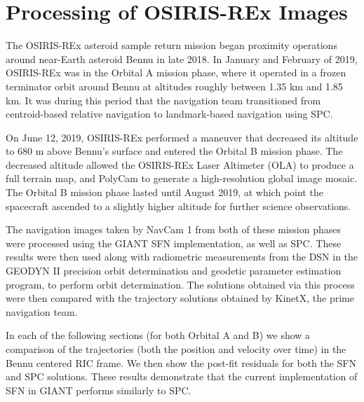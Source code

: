 \documentclass{RPI-SIW}
\begin{document}
\section*{Processing of OSIRIS-REx Images}
The OSIRIS-REx asteroid sample return mission began proximity operations around near-Earth asteroid Bennu in late 2018.  In January and February of 2019, OSIRIS-REx was in the Orbital A mission phase, where it operated in a frozen terminator orbit around Bennu at altitudes roughly between 1.35 km and 1.85 km.  It was during this period that the navigation team transitioned from centroid-based relative navigation to landmark-based navigation using SPC.

On June 12, 2019, OSIRIS-REx performed a maneuver that decreased its altitude to 680 m above Bennu's surface and entered the Orbital B mission phase.  The decreased altitude allowed the OSIRIS-REx Laser Altimeter (OLA)\cite{ola} to produce a full terrain map, and PolyCam\cite{ocams} to generate a high-resolution global image mosaic.  The Orbital B mission phase lasted until August 2019, at which point the spacecraft ascended to a slightly higher altitude for further science observations.

The navigation images taken by NavCam 1\cite{tagcams} from both of these mission phases were processed using the GIANT SFN implementation, as well as SPC.  These results were then used along with radiometric measurements from the DSN in the GEODYN II precision orbit determination and geodetic parameter estimation program, to perform orbit determination.  The solutions obtained via this process were then compared with the trajectory solutions obtained by KinetX, the prime navigation team.

In each of the following sections (for both Orbital A and B) we show a comparison of the trajectories (both the position and velocity over time) in the Bennu centered RIC frame.  We then show the post-fit residuals for both the SFN and SPC solutions. These results demonstrate that the current implementation of SFN in GIANT performs similarly to SPC.
\end{document}
